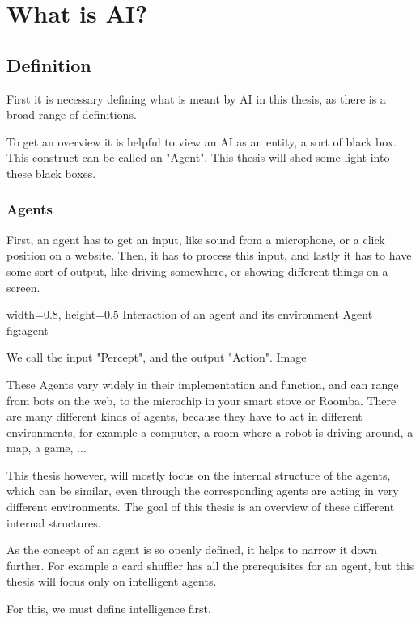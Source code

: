 \chapter{What is AI?}
\section{Definition}
First it is necessary defining what is meant by AI in this thesis, as there is a broad range of definitions.%

To get an overview it is helpful to view an AI as an entity, a sort of black box. This construct can be called an "Agent". 
This thesis will shed some light into these black boxes.

\subsection{Agents}
First, an agent has to get an input, like sound from a microphone, or a click position on a website.
Then, it has to process this input, 
and lastly it has to have some sort of output, like driving somewhere, or showing different things on a screen.

    {width=0.8\textwidth, height=0.5\textheight} %
    {Interaction of an agent and its environment}   %
    {Agent}   %
    {fig:agent}    %

We call the input "Percept", and the output "Action". %
Image

These Agents vary widely in their implementation and function, and can range from bots on the web, to the microchip in your smart stove or Roomba. 
There are many different kinds of agents, because they have to act in different environments, for example a computer, a room where a robot is driving around, a map, a game, ...

This thesis however, will mostly focus on the internal structure of the agents, which can be similar, even through the corresponding agents are acting in very different environments.
The goal of this thesis is an overview of these different internal structures.

As the concept of an agent is so openly defined, it helps to narrow it down further. For example a card shuffler has all the prerequisites for an agent, but this thesis will focus only on intelligent agents.

For this, we must define intelligence first.
